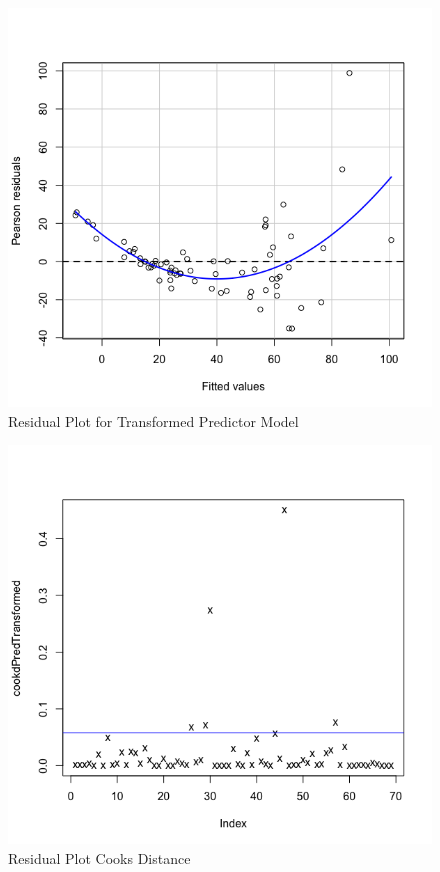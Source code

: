 \documentclass[12pt]{article}
\makeatletter
\theoremstyle{homework}
\newenvironment{exercise}[1]
{\def\@currentlabel{#1}\exercisecore}
{\endexercisecore}
\makeatother
\begin{document}
\begin{exercise}{1}
\begin{enumerate}
\begin{figure}[H]
\begin{center}
        \end{center}
      \end{figure}
      \begin{figure}[H]
        \begin{center}
        \caption{Residual Plot for Transformed Predictor Model}
        \includegraphics[width = \textwidth]{Rplot07.png}
        \end{center}
      \end{figure}
      \begin{figure}[H]
        \begin{center}
        \caption{Residual Plot Cooks Distance}
        \includegraphics[width = \textwidth]{Rplot08.png}
        \end{center}
      \end{figure}
      \newpage



\end{enumerate}
\end{exercise}
\end{document}
